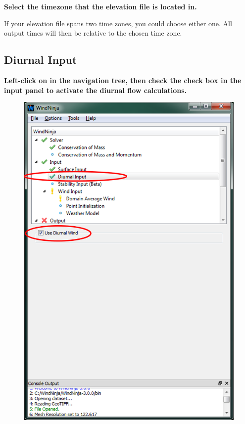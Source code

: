 \documentclass[12pt]{article}
\begin{document}
\textbf{\color{red} Select the timezone that the elevation file is located in.}

If your elevation file spans two time zones, you could choose either one.  All output times will then be relative to the chosen time zone.

\subsection{Diurnal Input}

\textbf{\color{red}Left-click on  in the navigation tree, then check the  check box in the input panel to activate the diurnal flow calculations.}

\begin{figure}[H]
	\centering
	\label{}
	\includegraphics[scale=1.0]{imgs/diurnal_layout_1.png}
\end{figure}
\end{document}
